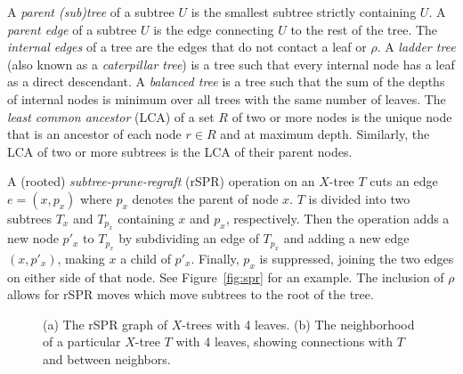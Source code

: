 \documentclass[]{elsarticle}
\let\MYoriglatexcaption\caption
\renewcommand{\caption}[2][\relax]{\MYoriglatexcaption[#2]{#2}}
\begin{document}
A \emph{parent (sub)tree} of a subtree $U$ is the smallest subtree strictly containing $U$.
A \emph{parent edge} of a subtree $U$ is the edge connecting $U$ to the rest of the tree.
The \emph{internal edges} of a tree are the edges that do not contact a leaf or $\rho$.
A \emph{ladder tree} (also known as a \emph{caterpillar tree}) is a tree such that every internal node has a leaf as a direct descendant.
A \emph{balanced tree} is a tree such that the sum of the depths of internal nodes is minimum over all trees with the same number of leaves.
The \emph{least common ancestor} (LCA) of a set $R$ of two or more nodes is the unique node that is an ancestor of each node $r \in R$ and at maximum depth.
Similarly, the LCA of two or more subtrees is the LCA of their parent nodes.

A (rooted) \emph{subtree-prune-regraft} (rSPR) operation on an $X$-tree $T$ cuts an edge $e = (x, p_x)$ where $p_x$ denotes the parent of node $x$.
$T$ is divided into two subtrees $T_x$ and $T_{p_x}$ containing $x$ and $p_x$, respectively.
Then the operation adds a new node $p'_x$ to $T_{p_x}$ by subdividing an edge of $T_{p_x}$ and adding a new edge $(x, p'_x)$, making $x$ a child of $p'_x$.
Finally, $p_x$ is suppressed, joining the two edges on either side of that node.
See Figure~\ref{fig:spr} for an example.
The inclusion of $\rho$ allows for rSPR moves which move subtrees to the root of the tree.

\begin{figure}
	\caption{(a) The rSPR graph of $X$-trees with 4 leaves. (b) The neighborhood of a particular $X$-tree $T$ with 4 leaves, showing connections with $T$ and between neighbors.}
\end{figure}
\end{document}
